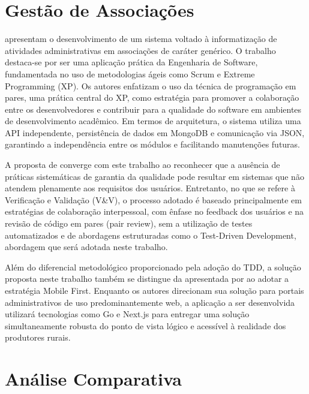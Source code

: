 \section{Gestão de Associações}
\label{sec:gestao_associacoes}

 apresentam o desenvolvimento de um sistema voltado à informatização de atividades administrativas em associações de caráter genérico. O trabalho destaca-se por ser uma aplicação prática da Engenharia de Software, fundamentada no uso de metodologias ágeis como Scrum e Extreme Programming (XP). Os autores enfatizam o uso da técnica de programação em pares, uma prática central do XP, como estratégia para promover a colaboração entre os desenvolvedores e contribuir para a qualidade do software em ambientes de desenvolvimento acadêmico. Em termos de arquitetura, o sistema utiliza uma API independente, persistência de dados em MongoDB e comunicação via JSON, garantindo a independência entre os módulos e facilitando manutenções futuras.

A proposta de  converge com este trabalho ao reconhecer que a ausência de práticas sistemáticas de garantia da qualidade pode resultar em sistemas que não atendem plenamente aos requisitos dos usuários. Entretanto, no que se refere à Verificação e Validação (V\&V), o processo adotado é baseado principalmente em estratégias de colaboração interpessoal, com ênfase no feedback dos usuários e na revisão de código em pares (pair review), sem a utilização de testes automatizados e de abordagens estruturadas como o Test-Driven Development, abordagem que será adotada neste trabalho.

Além do diferencial metodológico proporcionado pela adoção do TDD, a solução proposta neste trabalho também se distingue da apresentada por  ao adotar a estratégia Mobile First. Enquanto os autores direcionam sua solução para portais administrativos de uso predominantemente web, a aplicação a ser desenvolvida utilizará tecnologias como Go e Next.js para entregar uma solução simultaneamente robusta do ponto de vista lógico e acessível à realidade dos produtores rurais.

\section{Análise Comparativa}
\label{sec:analise_comparativa}

